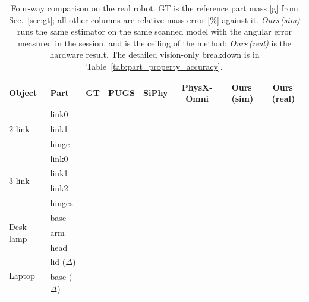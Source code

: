 \begin{table}[t]
\caption{Four-way comparison on the real robot. GT is the reference part mass
[g] from Sec.~\ref{sec:gt}; all other columns are relative mass error [\%]
against it. \emph{Ours\,(sim)} runs the same estimator on the same scanned model
with the angular error measured in the session, and is the ceiling of the
method; \emph{Ours\,(real)} is the hardware result.  The detailed vision-only breakdown is in
Table~\ref{tab:part_property_accuracy}.}
\label{tab:main}
\centering
\scriptsize
\setlength{\tabcolsep}{2.5pt}
\begin{tabular}{llcccccc}
\hline
Object & Part & GT & PUGS & SiPhy & PhysX-Omni & Ours\,(sim) & Ours\,(real) \\
\hline
\multirow{3}{*}{2-link}
  & link0  & \rev{--} & \rev{--} & \rev{--} & \rev{--} & \rev{--} & \rev{--} \\
  & link1  & \rev{--} & \rev{--} & \rev{--} & \rev{--} & \rev{--} & \rev{--} \\
  & hinge  & \rev{--} & \rev{--} & \rev{--} & \rev{--} & \rev{--} & \rev{--} \\
\hline
\multirow{4}{*}{3-link}
  & link0  & \rev{--} & \rev{--} & \rev{--} & \rev{--} & \rev{--} & \rev{--} \\
  & link1  & \rev{--} & \rev{--} & \rev{--} & \rev{--} & \rev{--} & \rev{--} \\
  & link2  & \rev{--} & \rev{--} & \rev{--} & \rev{--} & \rev{--} & \rev{--} \\
  & hinges & \rev{--} & \rev{--} & \rev{--} & \rev{--} & \rev{--} & \rev{--} \\
\hline
\multirow{3}{*}{Desk lamp}
  & base   & \rev{--} & \rev{--} & \rev{--} & \rev{--} & \rev{--} & \rev{--} \\
  & arm    & \rev{--} & \rev{--} & \rev{--} & \rev{--} & \rev{--} & \rev{--} \\
  & head   & \rev{--} & \rev{--} & \rev{--} & \rev{--} & \rev{--} & \rev{--} \\
\hline
\multirow{2}{*}{Laptop}
  & lid ($\Delta$)  & \rev{--} & \rev{--} & \rev{--} & \rev{--} & \rev{--} & \rev{--} \\
  & base ($\Delta$) & \rev{--} & \rev{--} & \rev{--} & \rev{--} & \rev{--} & \rev{--} \\
\hline
\end{tabular}
\end{table}